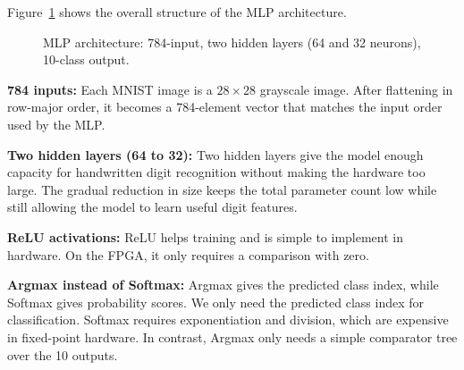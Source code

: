 \documentclass[12pt, letterpaper]{article}
\begin{document}
Figure~\ref{fig:mlp} shows the overall structure of the MLP architecture.

\begin{figure}[H]
\centering
{}
\caption{MLP architecture: 784-input, two hidden layers (64 and 32 neurons), 10-class output.}
\label{fig:mlp}
\end{figure}

\textbf{784 inputs:} Each MNIST image is a $28\times28$ grayscale image. After flattening in row-major order, it becomes a 784-element vector that matches the input order used by the MLP.

\textbf{Two hidden layers (64 to 32):} Two hidden layers give the model enough capacity for handwritten digit recognition without making the hardware too large. The gradual reduction in size keeps the total parameter count low while still allowing the model to learn useful digit features.

\textbf{ReLU activations:} ReLU helps training and is simple to implement in hardware. On the FPGA, it only requires a comparison with zero.

\textbf{Argmax instead of Softmax:} Argmax gives the predicted class index, while Softmax gives probability scores. We only need the predicted class index for classification. Softmax requires exponentiation and division, which are expensive in fixed-point hardware. In contrast, Argmax only needs a simple comparator tree over the 10 outputs.
\end{document}
